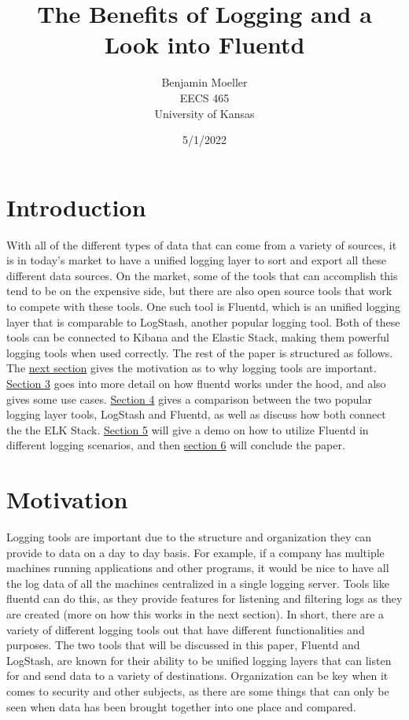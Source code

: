 \documentclass{article}
\title{The Benefits of Logging and a Look into Fluentd}
\author{Benjamin Moeller \\ EECS 465 \\ University of Kansas}
\date{5/1/2022}
\begin{document}
\maketitle

\section{Introduction} \label{sec: intro}
\quad \quad 
With all of the different types of data that can come from a variety of sources, it is in today's market
to have a unified logging layer to sort and export all these different data sources. On the market, some
of the tools that can accomplish this tend to be on the expensive side, but there are also open source tools that
work to compete with these tools. One such tool is Fluentd, which is an unified logging layer that is comparable to
LogStash, another popular logging tool. Both of these tools can be connected to Kibana and the Elastic Stack, 
making them powerful logging tools when used correctly. The rest of the paper is structured as follows. The 
\hyperref[sec:motiv]{next section} gives the motivation as to why logging tools are important. 
\hyperref[sec:works]{Section 3} goes into more detail on how fluentd works under the hood, and also gives some
use cases. \hyperref[sec:comp]{Section 4} gives a comparison between the two popular logging layer tools, LogStash 
and Fluentd, as well as discuss how both connect the the ELK Stack. \hyperref[sec:demo]{Section 5} will give a demo on how to 
utilize Fluentd in different logging scenarios, and then \hyperref[sec:conclude]{section 6} will conclude the paper.
\section{Motivation} \label{sec:motiv}
\quad \quad 
Logging tools are important due to the structure and organization they can provide to data on a day to 
day basis. For example, if a company has multiple machines running applications and other programs, it would be nice 
to have all the log data of all the machines centralized in a single logging server. Tools like fluentd can do this, as 
they provide features for listening and filtering logs as they are created (more on how this works in the next section). 
In short, there are a variety of different logging tools out that have different functionalities and purposes. The two tools
that will be discussed in this paper, Fluentd and LogStash, are known for their ability to be unified logging layers that can
listen for and send data to a variety of destinations. Organization can be key when it comes to security and other subjects,
as there are some things that can only be seen when data has been brought together into one place and compared.
\end{document}
